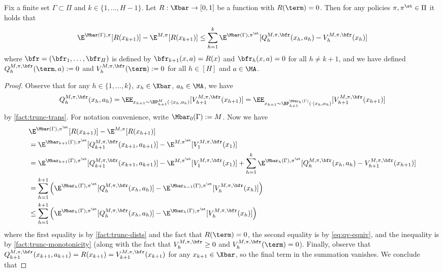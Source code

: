 \begin{lemma}\label{lemma:perf-diff-trunc}
Fix a finite set $\Gamma \subset \Pi$ and $k \in \{1,\dots,H-1\}$. Let $R:\Xbar\to[0,1]$ be a function with $R(\term)=0$. Then for any policies $\pi,\pi^\st \in \Pi$ it holds that
\[\E^{\Mbar(\Gamma),\pi}[R(x_{k+1})] - \E^{M,\pi}[R(x_{k+1})] \leq \sum_{h=1}^k \E^{\Mbar(\Gamma),\pi^\st}[Q^{M,\pi,\bfr}_h(x_h,a_h) - V^{M,\pi,\bfr}_h(x_h)]\]
where $\bfr=(\bfr_1,\dots,\bfr_H)$ is defined by $\bfr_{k+1}(x,a) = R(x)$ and $\bfr_h(x,a) = 0$ for all $h \neq k+1$, and we have defined $Q^{M,\pi,\bfr}_h(\term,a) := 0$ and $V^{M,\pi,\bfr}_h(\term) := 0$ for all $h \in [H]$ and $a \in \MA$.
\end{lemma}

\begin{proof}
Observe that for any $h \in \{1,\dots,k\}$, $x_h \in \Xbar$, $a_h \in \MA$, we have
\begin{equation}
Q^{M,\pi,\bfr}_h(x_h,a_h) 
= \EE_{x_{h+1} \sim \BP^M_{h+1}(\cdot|x_h,a_h)}[V^{M,\pi,\bfr}_{h+1}(x_{h+1})]
= \EE_{x_{h+1} \sim \BP^{\Mbar_h(\Gamma)}_{h+1}(\cdot|x_h,a_h)}[V^{M,\pi,\bfr}_{h+1}(x_{h+1})]
\label{eq:qv-equiv}
\end{equation}
by \cref{fact:trunc-trans}. For notation convenience, write $\Mbar_0(\Gamma) := M$. Now we have
\begin{align*}
&\E^{\Mbar(\Gamma),\pi^\st}[R(x_{k+1})] - \E^{M,\pi}[R(x_{h+1})] \\ 
&= \E^{\Mbar_{k+1}(\Gamma),\pi^\st}[Q^{M,\pi,\bfr}_{k+1}(x_{k+1},a_{k+1})] - \E^{M,\pi^\st}[V^{M,\pi,\bfr}_1(x_1)] \\ 
&= \E^{\Mbar_{k+1}(\Gamma),\pi^\st}[Q^{M,\pi,\bfr}_{k+1}(x_{k+1},a_{k+1})] - \E^{M,\pi^\st}[V^{M,\pi,\bfr}_1(x_1)] + \sum_{h=1}^k \E^{\Mbar_h(\Gamma),\pi^\st}[Q^{M,\pi,\bfr}_h(x_h,a_h) - V^{M,\pi,\bfr}_{h+1}(x_{h+1})] \\ 
&= \sum_{h=1}^{k+1}\left ( \E^{\Mbar_h(\Gamma),\pi^\st}[Q^{M,\pi,\bfr}_h(x_h,a_h)] - \E^{\Mbar_{h-1}(\Gamma),\pi^\st}[V^{M,\pi,\bfr}_h(x_h)]\right) \\ 
&\leq \sum_{h=1}^{k+1} \left(\E^{\Mbar_h(\Gamma),\pi^\st}[Q^{M,\pi,\bfr}_h(x_h,a_h)] - \E^{\Mbar_h(\Gamma),\pi^\st}[V^{M,\pi,\bfr}_h(x_h)]\right)
\end{align*}
where the first equality is by \cref{fact:trunc-dists} and the fact that $R(\term)=0$, the second equality is by \cref{eq:qv-equiv}, and the inequality is by \cref{fact:trunc-monotonicity} (along with the fact that $V^{M,\pi,\bfr}_h \geq 0$ and $V^{M,\pi,\bfr}_h(\term) = 0$). Finally, observe that $Q^{M,\pi,\bfr}_{k+1}(x_{k+1},a_{k+1}) = R(x_{k+1}) = V^{M,\pi,\bfr}_{k+1}(x_{k+1})$ for any $x_{k+1} \in \Xbar$, so the final term in the summation vanishes. We conclude that

\end{proof}
